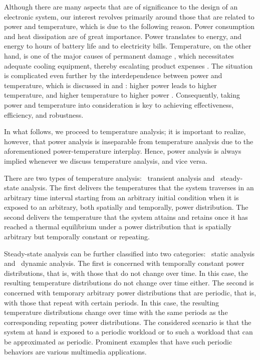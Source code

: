 Although there are many aspects that are of significance to the design of an
electronic system, our interest revolves primarily around those that are related
to power and temperature, which is due to the following reason. Power
consumption and heat dissipation are of great importance. Power translates to
energy, and energy to hours of battery life and to electricity bills.
Temperature, on the other hand, is one of the major causes of permanent damage
\cite{jedec2016}, which necessitates adequate cooling equipment, thereby
escalating product expenses \cite{chaudhry2015}. The situation is complicated
even further by the interdependence between power and temperature, which is
discussed in  and : higher power leads
to higher temperature, and higher temperature to higher power \cite{liu2007}.
Consequently, taking power and temperature into consideration is key to
achieving effectiveness, efficiency, and robustness.

In what follows, we proceed to temperature analysis; it is important to realize,
however, that power analysis is inseparable from temperature analysis due to the
aforementioned power-temperature interplay. Hence, power analysis is always
implied whenever we discuss temperature analysis, and vice versa.

There are two types of temperature analysis: \one~transient analysis and
\two~steady-state analysis. The first delivers the temperatures that the system
traverses in an arbitrary time interval starting from an arbitrary initial
condition when it is exposed to an arbitrary, both spatially and temporally,
power distribution. The second delivers the temperature that the system attains
and retains once it has reached a thermal equilibrium under a power distribution
that is spatially arbitrary but temporally constant or repeating.

Steady-state analysis can be further classified into two categories: \one~static
analysis and \two~dynamic analysis. The first is concerned with temporally
constant power distributions, that is, with those that do not change over time.
In this case, the resulting temperature distributions do not change over time
either. The second is concerned with temporary arbitrary power distributions
that are periodic, that is, with those that repeat with certain periods. In this
case, the resulting temperature distributions change over time with the same
periods as the corresponding repeating power distributions. The considered
scenario is that the system at hand is exposed to a periodic workload or to such
a workload that can be approximated as periodic. Prominent examples that have
such periodic behaviors are various multimedia applications.
